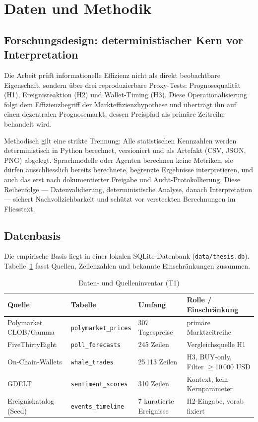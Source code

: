 \section{Daten und Methodik}
\label{ch:methodik}

\subsection{Forschungsdesign: deterministischer Kern vor Interpretation}

Die Arbeit prüft informationelle Effizienz nicht als direkt beobachtbare
Eigenschaft, sondern über drei reproduzierbare Proxy-Tests: Prognosequalität
(H1), Ereignisreaktion (H2) und Wallet-Timing (H3). Diese Operationalisierung
folgt dem Effizienzbegriff der Markteffizienzhypothese \citep{lit_emh_001} und
überträgt ihn auf einen dezentralen Prognosemarkt, dessen Preispfad als
primäre Zeitreihe behandelt wird.

Methodisch gilt eine strikte Trennung: Alle statistischen Kennzahlen werden
deterministisch in Python berechnet, versioniert und als Artefakt (CSV, JSON,
PNG) abgelegt. Sprachmodelle oder Agenten berechnen keine Metriken, sie dürfen
ausschliesslich bereits berechnete, begrenzte Ergebnisse interpretieren, und
auch das erst nach dokumentierter Freigabe und Audit-Protokollierung. Diese
Reihenfolge --- Datenvalidierung, deterministische Analyse, danach Interpretation
--- sichert Nachvollziehbarkeit und schützt vor versteckten Berechnungen im
Fliesstext.

\subsection{Datenbasis}

Die empirische Basis liegt in einer lokalen SQLite-Datenbank
(\texttt{data/thesis.db}). Tabelle~\ref{tab:t1} fasst Quellen, Zeilenzahlen und
bekannte Einschränkungen zusammen.

\begin{table}[ht]
\centering
\caption{Daten- und Quelleninventar (T1)}
\label{tab:t1}
\small
\begin{tabular}{@{}llll@{}}
\toprule
Quelle & Tabelle & Umfang & Rolle / Einschränkung \\
\midrule
Polymarket CLOB/Gamma & \texttt{polymarket\_prices} & 307 Tagespreise & primäre Marktzeitreihe \\
FiveThirtyEight & \texttt{poll\_forecasts} & 245 Zeilen & Vergleichsquelle H1 \\
On-Chain-Wallets & \texttt{whale\_trades} & 25\,113 Zeilen & H3, BUY-only, Filter $\geq$10\,000 USD \\
GDELT & \texttt{sentiment\_scores} & 310 Zeilen & Kontext, kein Kernparameter \\
Ereigniskatalog (Seed) & \texttt{events\_timeline} & 7 kuratierte Ereignisse & H2-Eingabe, vorab fixiert \\
\bottomrule
\end{tabular}
\end{table}

